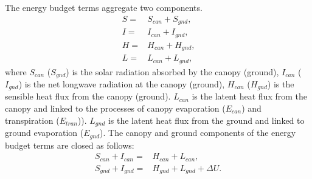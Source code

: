 \documentclass[essd]{copernicus}
\begin{document}
The energy budget terms aggregate two components.
\begin{align}
    S = & S_{can} + S_{gnd} \text{,} \\
    I = & I_{can} + I_{gnd} \text{,} \\
    H = & H_{can} + H_{gnd} \text{,} \\
    L = & L_{can} + L_{gnd} \text{,}
\end{align}
where $S_{can}$ ($S_{gnd}$) is the solar radiation absorbed by the canopy
(ground), $I_{can}$ ($I_{gnd}$) is the net longwave radiation at the canopy
(ground), $H_{can}$ ($H_{gnd}$) is the sensible heat flux from the canopy
(ground). $L_{can}$ is the latent heat flux from the canopy and linked to the
processes of canopy evaporation ($E_{can}$) and transpiration ($E_{tran}$)).
$L_{gnd}$ is the latent heat flux from the ground and linked to ground
evaporation ($E_{gnd}$). The canopy and ground components of the energy budget
terms are closed as follows:
\begin{align}
    S_{can} + I_{can} = & H_{can} + L_{can} \text{,}            \\
    S_{gnd} + I_{gnd} = & H_{gnd} + L_{gnd} + \Delta U \text{.}
\end{align}
\end{document}
